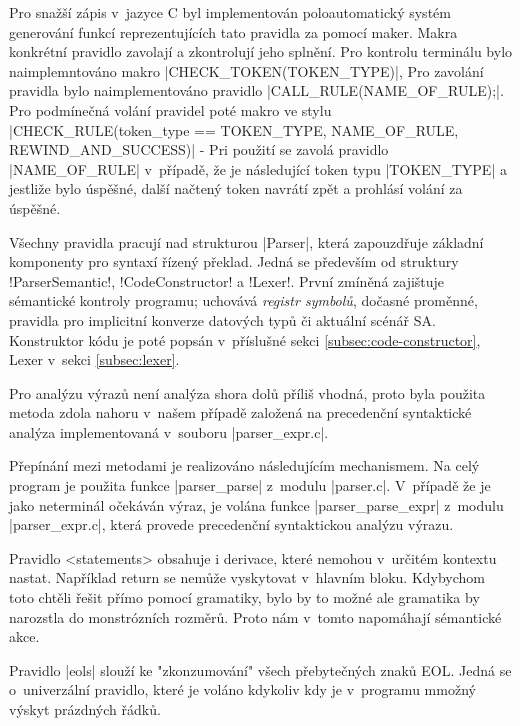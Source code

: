Pro snažší zápis v~jazyce C byl implementován poloautomatický systém generování funkcí reprezentujících tato pravidla za pomocí maker.
Makra konkrétní pravidlo zavolají a zkontrolují jeho splnění. Pro kontrolu terminálu bylo naimplemntováno makro
\ic|CHECK_TOKEN(TOKEN_TYPE)|,
Pro zavolání pravidla bylo naimplementováno pravidlo \ic|CALL_RULE(NAME_OF_RULE);|.
Pro podmínečná volání pravidel poté makro ve stylu
\ic|CHECK_RULE(token_type == TOKEN_TYPE, NAME_OF_RULE, REWIND_AND_SUCCESS)| - Pri použití se zavolá pravidlo
\ic|NAME_OF_RULE| v~případě, že je následující token typu \ic|TOKEN_TYPE| a jestliže bylo úspěšné, další načtený
token navrátí zpět a prohlásí volání za úspěšné.

Všechny pravidla pracují nad strukturou \ic|Parser|, která zapouzdřuje základní komponenty pro syntaxí řízený překlad.
Jedná se především od struktury \ic!ParserSemantic!, \ic!CodeConstructor! a \ic!Lexer!. První zmíněná zajištuje sémantické
kontroly programu; uchovává \emph{registr symbolů}, dočasné proměnné, pravidla pro implicitní konverze datových typů či
aktuální scénář SA. Konstruktor kódu je poté popsán v~příslušné sekci \ref{subsec:code-constructor}, Lexer v~sekci
\ref{subsec:lexer}.

Pro analýzu výrazů není analýza shora dolů příliš vhodná, proto byla
použita metoda zdola nahoru v~našem případě založená na precedenční
syntaktické analýza implementovaná v~souboru \ic|parser_expr.c|.

Přepínání mezi metodami je realizováno následujícím mechanismem. Na celý program je použita funkce \ic|parser_parse|
z~modulu \ic|parser.c|. V~případě že je jako neterminál očekáván výraz, je volána funkce \ic|parser_parse_expr|
z~modulu \ic|parser_expr.c|, která provede precedenční syntaktickou analýzu výrazu.

Pravidlo <statements> obsahuje i derivace, které nemohou v~určitém kontextu nastat.
Například return se nemůže vyskytovat v~hlavním bloku. Kdybychom toto chtěli řešit
přímo pomocí gramatiky, bylo by to možné ale gramatika by narozstla do monstrózních rozměrů.
Proto nám v~tomto napomáhají sémantické akce.

Pravidlo \ic|eols| slouží ke "zkonzumování" všech přebytečných znaků EOL.
Jedná se o~univerzální pravidlo, které je voláno kdykoliv kdy je v~programu
mmožný výskyt prázdných řádků.

